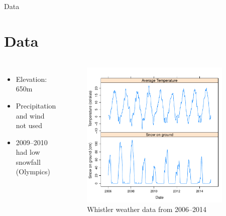 \documentclass{beamer}
\begin{document}
\begin{frame}{Data}

\section{Data}

\begin{columns}


{\small
\begin{itemize}
\item Elevation: 650m
\item Precipitation and wind not used
\item 2009--2010 had low snowfall (Olympics)
\end{itemize}
}

\vspace{30mm}


\vspace{-18mm}
\begin{figure}
\includegraphics[width=0.9\textwidth]{report-basicts}
\vspace{-2mm}
\caption{{\small Whistler weather data from 2006--2014}}
\vspace{10mm}
\end{figure}

\end{columns}

\end{frame}
\end{document}
